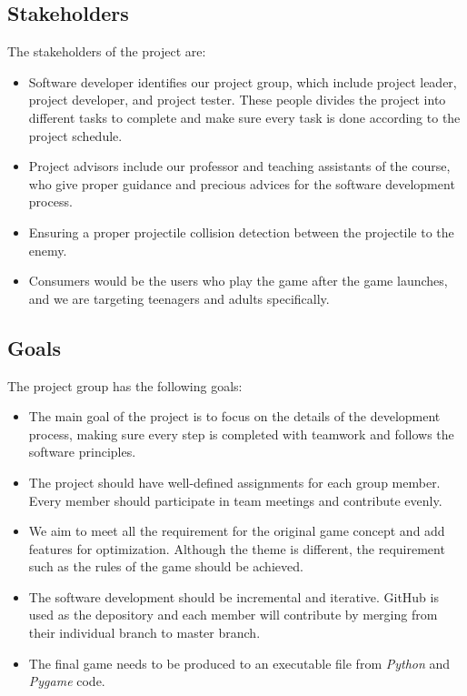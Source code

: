 \documentclass{article}
\begin{document}
\subsection{Stakeholders}
The stakeholders of the project are:
\begin{itemize}
    \item Software developer identifies our project group, which include project leader, project developer, and project tester. These people divides the project into different tasks to complete and make sure every task is done according to the project schedule.
    \item Project advisors include our professor and teaching assistants of the course, who give proper guidance and precious advices for the software development process.
    \item Ensuring a proper projectile collision detection between the projectile to the enemy.
    \item Consumers would be the users who play the game after the game launches, and we are targeting teenagers and adults specifically.
\end{itemize}

\subsection{Goals}
The project group has the following goals:
\begin{itemize}
    \item The main goal of the project is to focus on the details of the development process, making sure every step is completed with teamwork and follows the software principles.
    \item The project should have well-defined assignments for each group member. Every member should participate in team meetings and contribute evenly.
    \item We aim to meet all the requirement for the original game concept and add features for optimization. Although the theme is different, the requirement such as the rules of the game should be achieved.
    \item The software development should be incremental and iterative. GitHub is used as the depository and each member will contribute by merging from their individual branch to master branch.
    \item The final game needs to be produced to an executable file from \textit{Python} and \textit{\textit{Pygame}} code.
\end{itemize}
\newpage
\end{document}
